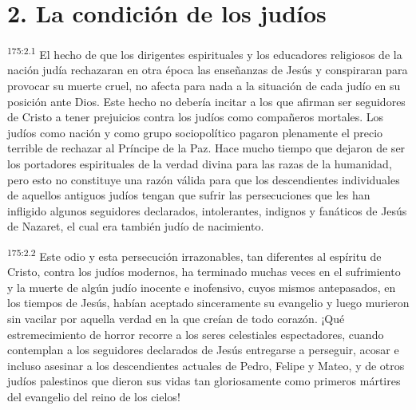 \section*{2. La condición de los judíos}
\par 
\textsuperscript{175:2.1} El hecho de que los dirigentes espirituales y los educadores religiosos de la nación judía rechazaran en otra época las enseñanzas de Jesús y conspiraran para provocar su muerte cruel, no afecta para nada a la situación de cada judío en su posición ante Dios. Este hecho no debería incitar a los que afirman ser seguidores de Cristo a tener prejuicios contra los judíos como compañeros mortales. Los judíos como nación y como grupo sociopolítico pagaron plenamente el precio terrible de rechazar al Príncipe de la Paz. Hace mucho tiempo que dejaron de ser los portadores espirituales de la verdad divina para las razas de la humanidad, pero esto no constituye una razón válida para que los descendientes individuales de aquellos antiguos judíos tengan que sufrir las persecuciones que les han infligido algunos seguidores declarados, intolerantes, indignos y fanáticos de Jesús de Nazaret, el cual era también judío de nacimiento.

\par 
\textsuperscript{175:2.2} Este odio y esta persecución irrazonables, tan diferentes al espíritu de Cristo, contra los judíos modernos, ha terminado muchas veces en el sufrimiento y la muerte de algún judío inocente e inofensivo, cuyos mismos antepasados, en los tiempos de Jesús, habían aceptado sinceramente su evangelio y luego murieron sin vacilar por aquella verdad en la que creían de todo corazón. ¡Qué estremecimiento de horror recorre a los seres celestiales espectadores, cuando contemplan a los seguidores declarados de Jesús entregarse a perseguir, acosar e incluso asesinar a los descendientes actuales de Pedro, Felipe y Mateo, y de otros judíos palestinos que dieron sus vidas tan gloriosamente como primeros mártires del evangelio del reino de los cielos!

